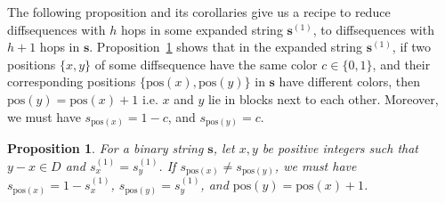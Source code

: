 \documentclass[11pt]{article}
\newtheorem{rem}{Remark}
\newtheorem{proposition}{Proposition}
\begin{document}





The following proposition and its corollaries give us a recipe to reduce diffsequences with $h$ hops in some expanded string $\mathbf{s}^{(1)}$, to diffsequences with $h+1$ hops in $\mathbf{s}$. Proposition~\ref{prop: reduce_diffseq} shows that in the expanded string $\mathbf{s}^{(1)}$, if two positions $\{x,y\}$ of some diffsequence have the same color $c \in \{0, 1 \}$, and their corresponding positions $\{\text{pos}(x), \text{pos}(y) \}$ in $\mathbf{s}$ have different colors, then $\text{pos}(y)=\text{pos}(x)+1$ i.e. $x$ and $y$ lie in blocks next to each other. Moreover, we must have $s_{\text{pos}(x)}=1-c$, and $ s_{\text{pos}(y)}=c$. 

\begin{proposition}\label{prop: reduce_diffseq}
    For a binary string $\mathbf{s}$,
    let $x,y$ be positive integers such that $y-x\in D$ and $s^{(1)}_x=s^{(1)}_y$. If $s_{\text{pos}(x)}\neq s_{\text{pos}(y)}$, we must have $s_{\text{pos}(x)}=1-s^{(1)}_x$, $ s_{\text{pos}(y)}=s^{(1)}_y$, and $\text{pos}(y)=\text{pos}(x)+1$.
\end{proposition}
\end{document}
